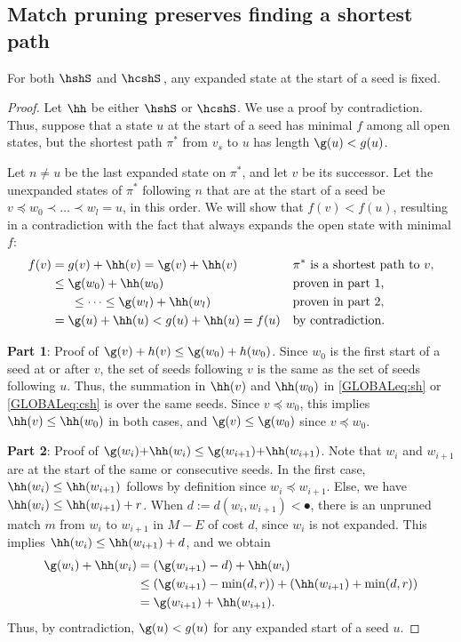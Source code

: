 \subsection{Match pruning preserves finding a shortest path}\label{GLOBALsec:pruning-proof}

\begin{lem}\label{GLOBALprop:consistent}
  For both $\hshS$ and $\hcshS$\,, any expanded state at the start of a seed is fixed.
\end{lem}
\begin{proof}
  Let $\hh$ be either $\hshS$ or $\hcshS$.
  We use a proof by contradiction.
  Thus, suppose that a state $u$ at the start of a seed has minimal $f$ among
  all open states, but the shortest path $\pi^*$ from $v_s$ to $u$ has length $\g(u) < g(u)$.

  Let $n\neq u$ be the last expanded state on $\pi^*$, and let $v$ be its successor.
  Let the unexpanded states of $\pi^*$ following $n$ that are at the start of a seed be
  $v\preceq w_0 \prec \dots\prec w_l=u$, in this order. We will show that
  $f(v) < f(u)$, resulting in a contradiction with the fact that \A always
  expands the open state with minimal $f$:
  \begin{align*}
    f(v) &= g(v)+\hh(v)
         = \g(v)+\hh(v) && \text{$\pi^*$ is a shortest path to $v$,} \\
         &\leq \g(w_0)+\hh(w_0) && \text{proven in part 1,} \\
         &\phantom{aaa}\leq \cdots \leq \g(w_l)+\hh(w_l) && \text{proven in part 2,} \\
         &= \g(u)+\hh(u)
         < g(u)+\hh(u) = f(u) && \text{by contradiction.}
  \end{align*}

  \textbf{Part 1}: Proof of $\g(v)+h(v) \leq \g(w_0)+h(w_0)$.
  Since $w_0$ is the first start of a seed at or after $v$, the set of seeds
  following $v$ is the same as the set of seeds following $u$. Thus, the
  summation in $\hh(v)$ and $\hh(w_0)$ in \cref{GLOBALeq:sh} or \cref{GLOBALeq:csh} is over
  the same seeds. Since $v\preceq w_0$, this implies $\hh(v) \leq \hh(w_0)$ in
  both cases, and $\g(v) \leq \g(w_0)$ since $v\preceq w_0$.

  \textbf{Part 2}: Proof of $\g(w_i){+}\hh(w_i) \leq \g(w_{i+1}){+}\hh(w_{i+1})$.
  Note that $w_i$ and $w_{i+1}$ are at the start of the same or consecutive
  seeds. In the first case,
  $\hh(w_i) \leq \hh(w_{i+1})$ follows by definition since $w_i \preceq w_{i+1}$.
  Else, we have $\hh(w_i) \leq \hh(w_{i+1})+r$.
  When $d:=d(w_i, w_{i+1}) < \spot$, there is an unpruned match $m$ from $w_i$
  to $w_{i+1}$ in $M-E$ of cost $d$, since $w_i$ is not expanded.
  This implies $\hh(w_i) \leq \hh(w_{i+1}) + d$, and we obtain
  \begin{align*}
    \g(w_i) + \hh(w_i) &= (\g(w_{i+1}) - d) + \hh(w_i)\\
                       &\leq (\g(w_{i+1})-\min(d,r)) + (\hh(w_{i+1}) + \min(d,r))\\
                       &= \g(w_{i+1}) + \hh(w_{i+1}).
  \end{align*}
  Thus, by contradiction, $\g(u) < g(u)$ for any expanded start of a seed $u$.
\end{proof}


